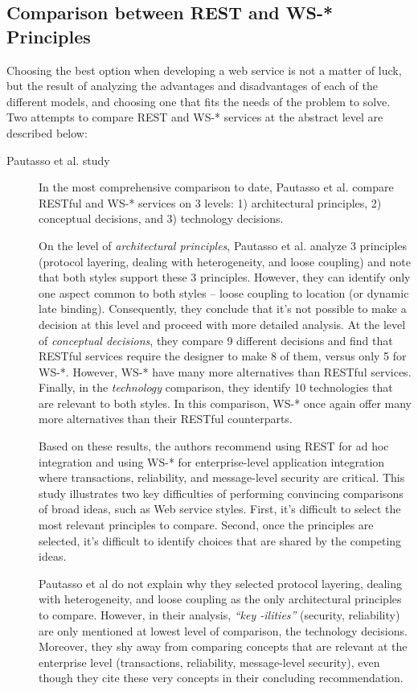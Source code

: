 \subsection{Comparison between REST and WS-* Principles}
Choosing the best option when developing a web service is not a matter of luck, but the result of analyzing the advantages and disadvantages of each of the different models, and choosing one that fits the needs of the problem to solve. Two attempts to compare REST and WS-* services at the abstract level are described below:

\begin{description}
\item[Pautasso et al. study] In the most comprehensive comparison to date, Pautasso et al.\cite{Pautasso:2008} compare RESTful and WS-* services on 3 levels: 1) architectural principles, 2) conceptual decisions, and 3) technology decisions.

On the level of \emph{architectural principles}, Pautasso et al. analyze 3 principles (protocol layering, dealing with heterogeneity, and loose coupling) and note that both styles support these 3 principles. However, they can identify only one aspect common to both styles -- loose coupling to location (or dynamic late binding). Consequently, they conclude that it's not possible to make a decision at this level and proceed with more detailed analysis. At the level of \emph{conceptual decisions}, they compare 9 different decisions and find that RESTful services require the designer to make 8 of them, versus only 5 for WS-*. However, WS-* have many more alternatives than RESTful services. Finally, in the \emph{technology} comparison, they identify 10 technologies that are relevant to both styles. In this comparison, WS-* once again offer many more alternatives than their RESTful counterparts.

Based on these results, the authors recommend using REST for ad hoc integration and using WS-* for enterprise-level application integration where transactions, reliability, and message-level security are critical. This study illustrates two key difficulties of performing convincing comparisons of broad ideas, such as Web service styles. First, it's difficult to select the most relevant principles to compare. Second, once the principles are selected, it's difficult to identify choices that are shared by the competing ideas.

Pautasso et al do not explain why they selected protocol layering, dealing with heterogeneity, and loose coupling as the only architectural principles to compare. However, in their analysis, \textit{``key -ilities''} (security, reliability) are only mentioned at lowest level of comparison, the technology decisions. Moreover, they shy away from comparing concepts that are relevant at the enterprise level (transactions, reliability, message-level security), even though they cite these very concepts in their concluding recommendation.


\end{description}
